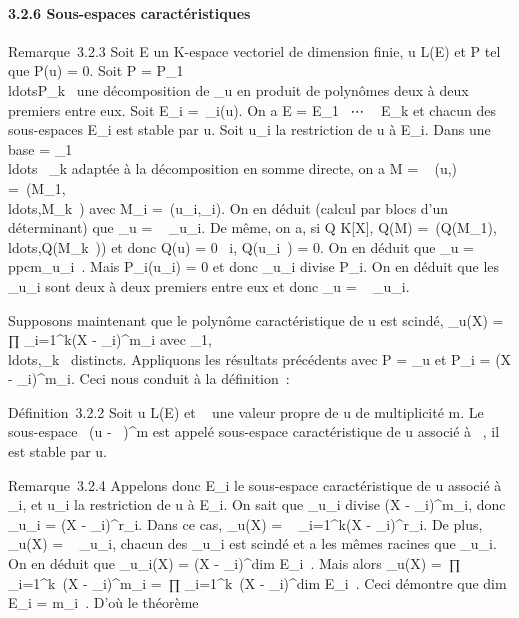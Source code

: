 \documentclass[]{article}
\begin{document}
\paragraph{3.2.6 Sous-espaces caractéristiques}

Remarque~3.2.3 Soit E un K-espace vectoriel de dimension finie, u \in L(E)
et P tel que P(u) = 0. Soit P =
P_1\\ldotsP_k~
une décomposition de \chi_u en produit de polynômes deux à deux
premiers entre eux. Soit E_i =\
\mathrmKerP_i(u). On a E = E_1
\oplus~⋯ \oplus~ E_k et chacun des sous-espaces
E_i est stable par u. Soit u_i la restriction de u à
E_i. Dans une base  = \mathcal{E}_1
\cup\\ldots~
\cup{}_k adaptée à la décomposition en somme directe, on a M
= \mathrmMat~ (u,\mathcal{E})
=\
\mathrmdiag(M_1,\\ldots,M_k~)
avec M_i =\
\mathrmMat (u_i,_i). On en
déduit (calcul par blocs d'un déterminant) que \chi_u
= \∏ ~
\chi_u_i. De même, on a, si Q \in K{[}X{]}, Q(M)
=\
\mathrmdiag(Q(M_1),\\ldots,Q(M_k~))
et donc Q(u) = 0 \Leftrightarrow
\forall~i, Q(u_i~) = 0. On en déduit que
\mu_u = ppcm\mu_u_i~.
Mais P_i(u_i) = 0 et donc \mu_u_i
divise P_i. On en déduit que les \mu_u_i sont
deux à deux premiers entre eux et donc \mu_u
= \∏ ~
\mu_u_i.

Supposons maintenant que le polynôme caractéristique de u est scindé,
\chi_u(X) = \\∏
 _i=1^k(X - \lambda_i)^m_i avec
\lambda_1,\\ldots,\lambda_k~
distincts. Appliquons les résultats précédents avec P = \chi_u et
P_i = (X - \lambda_i)^m_i. Ceci nous
conduit à la définition~:

Définition~3.2.2 Soit u \in L(E) et \lambda~ une valeur propre de u de
multiplicité m. Le sous-espace
\mathrmKer~(u -
\lambda~\mathrmId)^m est appelé sous-espace
caractéristique de u associé à \lambda~, il est stable par u.

Remarque~3.2.4 Appelons donc E_i le sous-espace caractéristique
de u associé à \lambda_i, et u_i la restriction de u à
E_i. On sait que \mu_u_i divise (X -
\lambda_i)^m_i, donc \mu_u_i = (X
- \lambda_i)^r_i. Dans ce cas, \mu_u(X)
= \∏ ~
_i=1^k(X - \lambda_i)^r_i. De plus,
\chi_u(X) = \∏ ~
\chi_u_i, chacun des \chi_u_i est scindé
et a les mêmes racines que \mu_u_i. On en déduit que
\chi_u_i(X) = (X -
\lambda_i)^dim E_i~. Mais
alors \chi_u(X) =\
∏  _i=1^k~(X -
\lambda_i)^m_i =\
∏ _i=1^k~(X -
\lambda_i)^dim E_i~. Ceci
démontre que dim E_i = m_i~.
D'où le théorème
\end{document}
